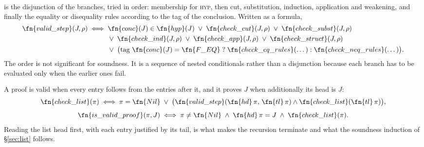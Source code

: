 \noindent
{} is the disjunction of the branches, tried in order:
membership for \textsc{hyp}, then cut, substitution, induction, application and
weakening, and finally the equality or disequality rules according to the tag
of the conclusion.  Written as a formula,
\begin{align*}
\fn{valid\_step}(J, \rho) \;\Longleftrightarrow\;\;
& \fn{conc}(J) \in \fn{hyp}(J)
  \;\vee\; \fn{check\_cut}(J, \rho)
  \;\vee\; \fn{check\_subst}(J, \rho)\\
&\vee\; \fn{check\_ind}(J, \rho)
  \;\vee\; \fn{check\_app}(J, \rho)
  \;\vee\; \fn{check\_struct}(J, \rho)\\
&\vee\; \bigl(\text{tag } \fn{conc}(J) = \fn{F\_EQ}
   \;?\; \fn{check\_eq\_rules}(\dots) : \fn{check\_neq\_rules}(\dots)\bigr).
\end{align*}
The order is not significant for soundness.  It is a sequence of nested
conditionals rather than a disjunction because each branch has to be evaluated
only when the earlier ones fail.


\noindent
A proof is valid when every entry follows from the entries after it, and it
proves $J$ when additionally its head is $J$:
\[
\fn{check\_list}(\pi) \;\Longleftrightarrow\;
\pi = \fn{Nil} \;\vee\;
\bigl(\fn{valid\_step}(\fn{hd}\,\pi,\, \fn{tl}\,\pi) \wedge \fn{check\_list}(\fn{tl}\,\pi)\bigr),
\]
\[
\fn{is\_valid\_proof}(\pi, J) \;\Longleftrightarrow\;
\pi \neq \fn{Nil} \;\wedge\; \fn{hd}\,\pi = J \;\wedge\; \fn{check\_list}(\pi).
\]
Reading the list head first, with each entry justified by its tail, is what
makes the recursion terminate and what the soundness induction of
\S\ref{sec:list} follows.
